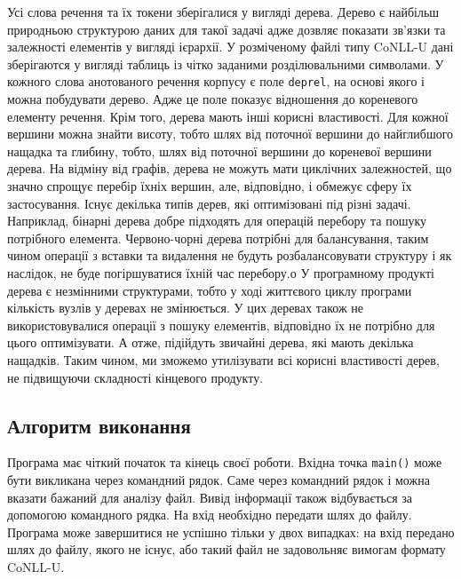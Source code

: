 Усі слова речення та їх токени зберігалися у вигляді дерева. Дерево є найбільш
природньою структурою даних для такої задачі адже дозвляє показати зв'язки
та залежності елементів у вигляді ієрархії. У розміченому файлі типу CoNLL-U дані зберігаются
у вигляді таблиць із чітко заданими розділювальними символами.
У кожного слова анотованого речення корпусу є поле \texttt{deprel},
на основі якого і можна побудувати дерево. Адже це поле показує відношення до кореневого
елементу речення. Крім того, дерева мають інші корисні властивості. Для кожної вершини
можна знайти висоту, тобто шлях від поточної вершини до найглибшого нащадка та глибину,
тобто, шлях від поточної вершини до кореневої вершини дерева.
На відміну від графів, дерева не можуть мати циклічних залежностей, що
значно спрощує перебір їхніх вершин, але, відповідно, і обмежує сферу їх застосування.
Існує декілька типів дерев, які оптимізовані під різні задачі. Наприклад, бінарні
дерева добре підходять для операцій перебору та пошуку потрібного елемента.
Червоно-чорні дерева потрібні для балансування, таким чином операції з вставки та
видалення не будуть розбалансовувати структуру і як наслідок, не буде погіршуватися
їхній час перебору.о У програмному продукті дерева є незмінними структурами, тобто
у ході життєвого циклу програми кількість вузлів у деревах не змінюється. У цих деревах
також не використовувалися операції з пошуку елементів, відповідно їх не потрібно
для цього оптимізувати. А отже, підійдуть звичайні дерева, які мають декілька
нащадків. Таким чином, ми зможемо утилізувати всі корисні властивості дерев,
не підвищуючи складності кінцевого продукту.

\subsection{Алгоритм виконання}
Програма має чіткий початок та кінець своєї роботи. Вхідна точка \texttt{main()} може
бути викликана через командний рядок. Саме через командний рядок і можна вказати бажаний
для аналізу файл. Вивід інформації також відбувається за допомогою командного
рядка. На вхід необхідно передати шлях до файлу. Програма може завершитися не успішно
тільки у двох випадках: на вхід передано шлях до файлу, якого не існує, або такий
файл не задовольняє вимогам формату CoNLL-U.


